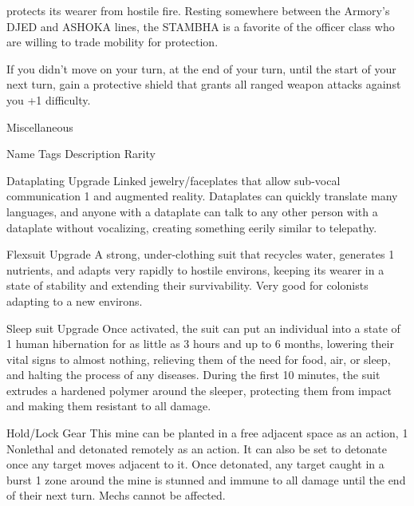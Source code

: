 protects its wearer from hostile fire. Resting somewhere between the Armory’s DJED and ASHOKA lines,
the STAMBHA is a favorite of the officer class who are willing to trade mobility for protection.

If you didn’t move on your turn, at the end of your turn, until the start of your next turn, gain a protective
shield that grants all ranged weapon attacks against you +1 difficulty.


                                                   Miscellaneous

  Name                Tags         Description                                                               Rarity

 Dataplating          Upgrade      Linked jewelry/faceplates that allow sub-vocal communication               1
                                   and augmented reality. Dataplates can quickly translate many
                                   languages, and anyone with a dataplate can talk to any other
                                   person with a dataplate without vocalizing, creating something
                                   eerily similar to telepathy.

 Flexsuit             Upgrade      A strong, under-clothing suit that recycles water, generates               1
                                   nutrients, and adapts very rapidly to hostile environs, keeping its
                                   wearer in a state of stability and extending their survivability. Very
                                   good for colonists adapting to a new environs.

 Sleep suit           Upgrade      Once activated, the suit can put an individual into a state of             1
                                   human hibernation for as little as 3 hours and up to 6 months,
                                   lowering their vital signs to almost nothing, relieving them of the
                                   need for food, air, or sleep, and halting the process of any
                                   diseases. During the first 10 minutes, the suit extrudes a
                                   hardened polymer around the sleeper, protecting them from
                                   impact and making them resistant to all damage.




 Hold/Lock          Gear        This mine can be planted in a free adjacent space as an action,      1
 Nonlethal                      and detonated remotely as an action. It can also be set to
                                detonate once any target moves adjacent to it. Once detonated,
                                any target caught in a burst 1 zone around the mine is stunned
                                and immune to all damage until the end of their next turn. Mechs
                                cannot be affected.

